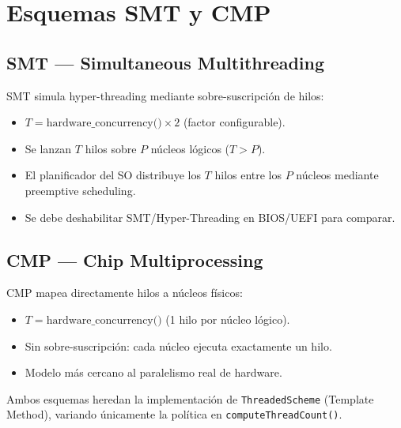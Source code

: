 \documentclass[11pt,a4paper]{article}
\begin{document}
\section{Esquemas SMT y CMP}
\label{sec:smt-cmp}

\subsection{SMT — Simultaneous Multithreading}

SMT simula hyper-threading mediante sobre-suscripción de hilos:

\begin{itemize}
  \item $T = \text{hardware\_concurrency()} \times 2$ (factor configurable).
  \item Se lanzan $T$ hilos sobre $P$ núcleos lógicos ($T > P$).
  \item El planificador del SO distribuye los $T$ hilos entre los $P$ núcleos mediante preemptive scheduling.
  \item Se debe deshabilitar SMT/Hyper-Threading en BIOS/UEFI para comparar.
\end{itemize}

\subsection{CMP — Chip Multiprocessing}

CMP mapea directamente hilos a núcleos físicos:

\begin{itemize}
  \item $T = \text{hardware\_concurrency()}$ (1 hilo por núcleo lógico).
  \item Sin sobre-suscripción: cada núcleo ejecuta exactamente un hilo.
  \item Modelo más cercano al paralelismo real de hardware.
\end{itemize}

Ambos esquemas heredan la implementación de \texttt{ThreadedScheme} (Template Method), variando únicamente la política en \texttt{computeThreadCount()}.

\end{document}
